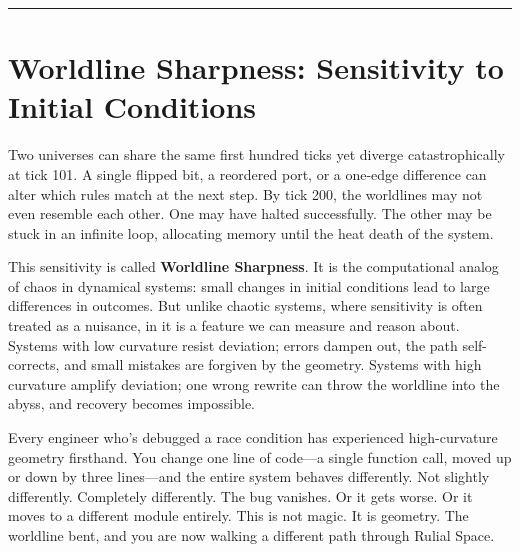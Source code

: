 \begin{center}
\rule{0.5\linewidth}{0.5pt}
\end{center}

\section{Worldline Sharpness: Sensitivity to Initial Conditions}
\label{6.3-worldline-sharpness}

Two universes can share the same first hundred ticks yet diverge catastrophically at tick 101. A
single flipped bit, a reordered port, or a one-edge difference can alter which rules match at the
next step. By tick 200, the worldlines may not even resemble each other. One may have halted
successfully. The other may be stuck in an infinite loop, allocating memory until the heat death of
the system.

This sensitivity is called \textbf{Worldline Sharpness}. It is the computational analog of chaos in
dynamical systems: small changes in initial conditions lead to large differences in outcomes. But
unlike chaotic systems, where sensitivity is often treated as a nuisance, in \COMPUTER{} it is a
feature we can measure and reason about. Systems with low curvature resist deviation; errors dampen
out, the path self-corrects, and small mistakes are forgiven by the geometry. Systems with high
curvature amplify deviation; one wrong rewrite can throw the worldline into the abyss, and recovery
becomes impossible.

Every engineer who's debugged a race condition has experienced high-curvature geometry firsthand.
You change one line of code—a single function call, moved up or down by three lines—and the entire
system behaves differently. Not slightly differently. Completely differently. The bug vanishes. Or it
gets worse. Or it moves to a different module entirely. This is not magic. It is geometry. The
worldline bent, and you are now walking a different path through Rulial Space.

